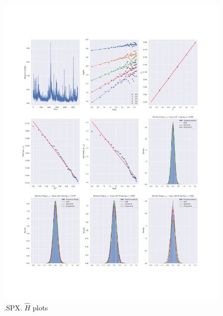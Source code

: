 	\begin{figure}[h]
		\centering
		\includegraphics[width=\linewidth]{fig/.SPX.pdf}
		\caption{.SPX. $\hat{H}$ plots}
	\end{figure}


